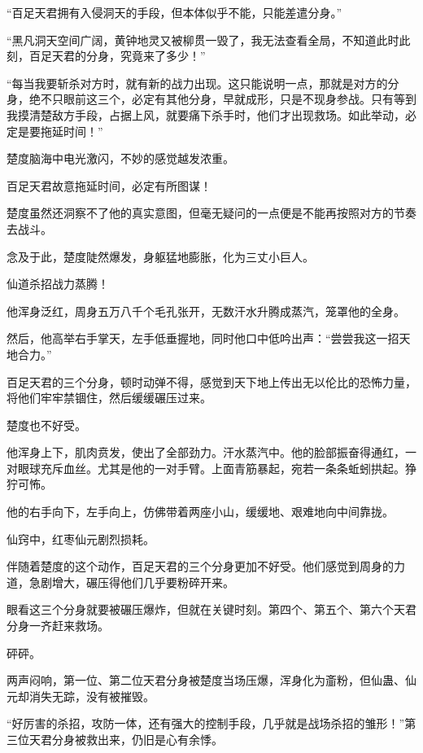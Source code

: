 
\begin{this_body}



“百足天君拥有入侵洞天的手段，但本体似乎不能，只能差遣分身。”

“黑凡洞天空间广阔，黄钟地灵又被柳贯一毁了，我无法查看全局，不知道此时此刻，百足天君的分身，究竟来了多少！”

“每当我要斩杀对方时，就有新的战力出现。这只能说明一点，那就是对方的分身，绝不只眼前这三个，必定有其他分身，早就成形，只是不现身参战。只有等到我摸清楚敌方手段，占据上风，就要痛下杀手时，他们才出现救场。如此举动，必定是要拖延时间！”

楚度脑海中电光激闪，不妙的感觉越发浓重。

百足天君故意拖延时间，必定有所图谋！

楚度虽然还洞察不了他的真实意图，但毫无疑问的一点便是不能再按照对方的节奏去战斗。

念及于此，楚度陡然爆发，身躯猛地膨胀，化为三丈小巨人。

仙道杀招战力蒸腾！

他浑身泛红，周身五万八千个毛孔张开，无数汗水升腾成蒸汽，笼罩他的全身。

然后，他高举右手掌天，左手低垂握地，同时他口中低吟出声：“尝尝我这一招天地合力。”

百足天君的三个分身，顿时动弹不得，感觉到天下地上传出无以伦比的恐怖力量，将他们牢牢禁锢住，然后缓缓碾压过来。

楚度也不好受。

他浑身上下，肌肉贲发，使出了全部劲力。汗水蒸汽中。他的脸部振奋得通红，一对眼球充斥血丝。尤其是他的一对手臂。上面青筋暴起，宛若一条条蚯蚓拱起。狰狞可怖。

他的右手向下，左手向上，仿佛带着两座小山，缓缓地、艰难地向中间靠拢。

仙窍中，红枣仙元剧烈损耗。

伴随着楚度的这个动作，百足天君的三个分身更加不好受。他们感觉到周身的力道，急剧增大，碾压得他们几乎要粉碎开来。

眼看这三个分身就要被碾压爆炸，但就在关键时刻。第四个、第五个、第六个天君分身一齐赶来救场。

砰砰。

两声闷响，第一位、第二位天君分身被楚度当场压爆，浑身化为齑粉，但仙蛊、仙元却消失无踪，没有被摧毁。

“好厉害的杀招，攻防一体，还有强大的控制手段，几乎就是战场杀招的雏形！”第三位天君分身被救出来，仍旧是心有余悸。


\end{this_body}
